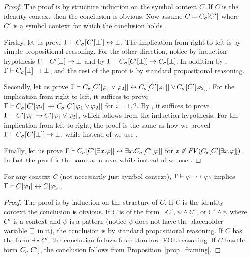 \documentclass{amsart}
\begin{document}
\begin{proof}
The proof is by structure induction on the symbol context $C$.
If $C$ is the identity context then the conclusion is obvious.
Now assume $C = C_{\sigma}[C']$ where $C'$ is a symbol context
for which the conclusion holds.

Firstly, let us prove 
$\Gamma \vdash C_{\sigma}[C'[\bot]] \leftrightarrow \bot$.
The implication from right to left is by simple propositional reasoning.
For the other direction,
notice by induction hypothesis
$\Gamma \vdash C'[\bot] \to \bot$
and by \framing
$\Gamma \vdash C_{\sigma}[C'[\bot]] \to C_{\sigma}[\bot]$.
In addition by \propagationbottom,
$\Gamma \vdash C_{\sigma}[\bot] \to \bot$,
and the rest of the proof is by standard propositional reasoning.

Secondly, let us prove
$\Gamma \vdash 
	          C_{\sigma}[C'[\varphi_1 \vee \varphi_2]] \leftrightarrow
	          C_{\sigma}[C'[\varphi_1]] \vee
	          C_{\sigma}[C'[\varphi_2]]$.
For the implication from right to left, 
it suffices to prove
$\Gamma \vdash C_{\sigma}[C'[\varphi_i]] 
  \to C_{\sigma}[C'[\varphi_1 \vee \varphi_2]]$
for $i = 1, 2$.
By \framing, it suffices to prove
$\Gamma \vdash C'[\varphi_i]
  \to C'[\varphi_1 \vee \varphi_2]$,
which follows from the induction hypothesis.
For the implication from left to right,
the proof is the same as 
how we proved $\Gamma \vdash C_{\sigma}[C'[\bot]] \to \bot$,
while instead of \propagationbottom we use \propagationvee.

Finally, let us prove
$\Gamma \vdash
	          C_{\sigma}[C'[\exists x . \varphi]] \leftrightarrow
	          \exists x . C_{\sigma}[C'[\varphi]] $
for $x \not\in \mathit{FV}(C_{\sigma}[C'[\exists x . \varphi]])$.
In fact the proof is the same as above, while instead of
\propagationvee we use \propagationexists.
\end{proof}

\begin{proposition}
\label{prop_congruence_provability_equiv}
For any context $C$ (not necessarily just symbol context),
$\Gamma \vdash \varphi_1 \leftrightarrow \varphi_2$
implies
$\Gamma \vdash C[\varphi_1] \leftrightarrow C[\varphi_2]$.
\end{proposition}
\begin{proof}
The proof is by induction on the structure of $C$.
If $C$ is the identity context the conclusion is obvious.
If $C$ is of the form 
$\neg C'$, 
$\psi \wedge C'$,
or $C' \wedge \psi$
where $C'$ is a context and $\psi$ is a pattern
(notice $\psi$ does not have the placeholder variable $\square$ in it),
the conclusion is by standard propositional reasoning.
If $C$ has the form $\exists x . C'$,
the conclusion follows from standard FOL reasoning.
If $C$ has the form $C_{\sigma}[C']$,
the conclusion follows from Proposition~\ref{prop_framing}.
\end{proof}
\end{document}
